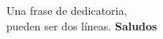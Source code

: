 \documentclass[letterpaper,oneside]{book}
\begin{document}
	
\templatePortrait

\templatePagecfg

\begin{resumen}
	\lipsum[1]
\end{resumen}

\begin{dedicatoria}
	Una frase de dedicatoria, \\
	pueden ser dos líneas. \newp
	\textbf{Saludos}
\end{dedicatoria}

\begin{agradecimientos}
	\lipsum[1]
\end{agradecimientos}

\templateIndex

\templateFinalcfg



\end{document}
